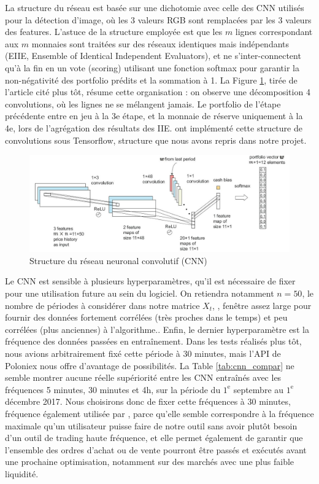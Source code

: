 \documentclass[a4paper, 10pt]{article}
\begin{document}
La structure du réseau est basée sur une dichotomie avec celle des CNN utilisés pour la détection d'image, où les 3 valeurs RGB sont remplacées par les 3 valeurs des features. L'astuce de la structure employée est que les $m$ lignes correspondant aux $m$ monnaies sont traitées sur des réseaux identiques mais indépendants (EIIE, Ensemble of Identical Independent Evaluators), et ne s'inter-connectent qu'à la fin en un vote (scoring) utilisant une fonction softmax pour garantir la non-négativité des portfolio prédits et la sommation à 1. La Figure \ref{fig:structure}, tirée de l'article cité plus tôt, résume cette organisation : on observe une décomposition 4 convolutions, où les lignes ne se mélangent jamais. Le portfolio de l'étape précédente entre en jeu à la 3e étape, et la monnaie de réserve uniquement à la 4e, lors de l'agrégation des résultats des IIE. \citet{Jiang2017} ont implémenté cette structure de convolutions sous Tensorflow, structure que nous avons repris dans notre projet.

\begin{figure}[ht!]
\begin{center}
\includegraphics[width=1.0\textwidth]{images/structure.JPG}
\caption{Structure du réseau neuronal convolutif (CNN)}
\label{fig:structure}
\end{center}
\end{figure}

Le CNN est sensible à plusieurs hyperparamètres, qu'il est nécessaire de fixer pour une utilisation future au sein du logiciel. On retiendra notamment $n = 50$, le nombre de périodes à considérer dans notre matrice $X_t$, , fenêtre assez large pour fournir des données fortement corrélées (très proches dans le temps) et peu corrélées (plus anciennes) à l'algorithme.. Enfin, le dernier hyperparamètre est la fréquence des données passées en entraînement. Dans les tests réalisés plus tôt, nous avions arbitrairement fixé cette période à 30 minutes, mais l'API de Poloniex nous offre d’avantage de possibilités. La Table \ref{tab:cnn_compar} ne semble montrer aucune réelle supériorité entre les CNN entraînés avec les fréquences 5 minutes, 30 minutes et 4h, sur la période du $1^{\text{e}}$ septembre au $1^{\text{e}}$ décembre 2017. Nous choisirons donc de fixer cette fréquences à 30 minutes, fréquence également utilisée par \citet{Jiang2017}, parce qu'elle semble correspondre à la fréquence maximale qu'un utilisateur puisse faire de notre outil sans avoir plutôt besoin d'un outil de trading haute fréquence, et elle permet également de garantir que l'ensemble des ordres d'achat ou de vente pourront être passés et exécutés avant une prochaine optimisation, notamment sur des marchés avec une plus faible liquidité.
\end{document}
